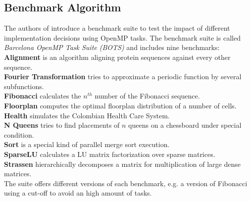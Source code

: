 \subsection{Benchmark Algorithm}
\label{subsec:BOTS}
  The authors of \cite{Duran.2009} introduce a benchmark suite to test the impact of different implementation decisions using OpenMP tasks.
  The benchmark suite is called \textit{Barcelona OpenMP Task Suite (BOTS)} and includes nine benchmarks:\\
    \textbf{Alignment} is an algorithm aligning protein sequences against every other sequence.\\
    \textbf{Fourier Transformation} tries to approximate a periodic function by several subfunctions.\\
    \textbf{Fibonacci} calculates the \(n^{th}\) number of the Fibonacci sequence.\\
    \textbf{Floorplan} computes the optimal floorplan distribution of a number of cells.\\
    \textbf{Health} simulates the Colombian Health Care System.\\
    \textbf{N Queens} tries to find placements of \(n\) queens on a chessboard under special condition.\\
    \textbf{Sort} is a special kind of parallel merge sort execution.\\
    \textbf{SparseLU} calculates a LU matrix factorization over sparse matrices.\\
    \textbf{Strassen} hierarchically decomposes a matrix for multiplication of large dense matrices.\\
  The suite offers different versions of each benchmark, e.g. a version of Fibonacci using a cut-off to avoid an high amount of tasks.
 
